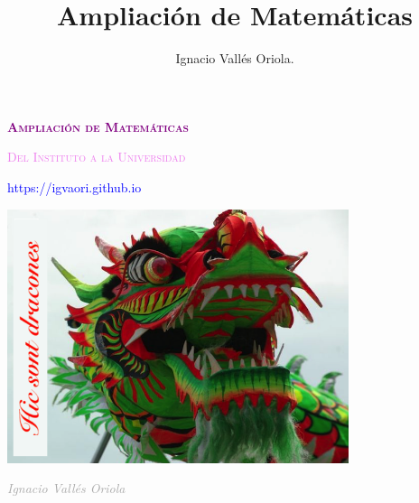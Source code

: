 \documentclass[a4paper, 11pt, spanish]{book}
\title{Ampliación de Matemáticas}
\author{Ignacio Vallés Oriola.}
\date{}
\numberwithin{equation}{chapter}
\numberwithin{teor}{chapter}
\numberwithin{coro}{chapter}
\numberwithin{prop}{chapter}
\numberwithin{defi}{chapter}
\numberwithin{axio}{chapter}
\numberwithin{ejem}{chapter}
\numberwithin{ejer}{chapter}
\numberwithin{ejre}{chapter}
\numberwithin{ayud}{chapter}
\numberwithin{solu}{chapter}
\numberwithin{prob}{chapter}
\begin{document}
\begin{titlepage}
	\centering
	\vspace*{\fill}
	{\scshape\Huge \textcolor{purple}{\textbf{Ampliación de Matemáticas}}\par}
	\vspace{1cm}
	{\scshape\Large \textcolor{violet}{Del Instituto a la Universidad}\par}
	\vspace{1cm}
	{\scriptsize  \textcolor{blue}{https://igvaori.github.io}    \par}

	\vspace{2cm}
	\includegraphics[width=0.75\textwidth]{imagenes/hic-svnt-dracones}
	\vspace{2cm}
	\begin{flushright}
		{\normalsize \textcolor{darkgray}{\textit{Ignacio Vallés Oriola}} \par}
	\end{flushright}
\end{titlepage}


\tableofcontents







%
%
%
%
%
%
%
%
%
%
%
%
\appendix

	
\end{document}
